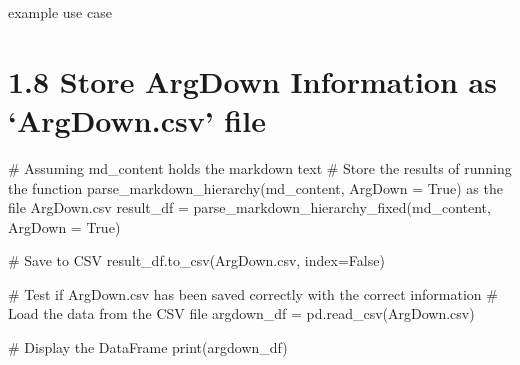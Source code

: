 \documentclass[
  11pt,
  letterpaper,
]{book}
\newenvironment{Shaded}{\begin{snugshade}}{\end{snugshade}}
\newcommand{\BuiltInTok}[1]{\textcolor[rgb]{0.00,0.23,0.31}{#1}}
\newcommand{\CommentTok}[1]{\textcolor[rgb]{0.37,0.37,0.37}{#1}}
\newcommand{\NormalTok}[1]{\textcolor[rgb]{0.00,0.23,0.31}{#1}}
\newcommand{\OperatorTok}[1]{\textcolor[rgb]{0.37,0.37,0.37}{#1}}
\newcommand{\StringTok}[1]{\textcolor[rgb]{0.13,0.47,0.30}{#1}}
\newcommand{\VariableTok}[1]{\textcolor[rgb]{0.07,0.07,0.07}{#1}}
\begin{document}
example use case

\section{1.8 Store ArgDown Information as `ArgDown.csv'
file}\label{store-argdown-information-as-argdown.csv-file}

\begin{Shaded}
\begin{Highlighting}[]
\CommentTok{\# Assuming \textquotesingle{}md\_content\textquotesingle{} holds the markdown text}
\CommentTok{\# Store the results of running the function parse\_markdown\_hierarchy(md\_content, ArgDown = True) as the file \textquotesingle{}ArgDown.csv\textquotesingle{}}
\NormalTok{result\_df }\OperatorTok{=}\NormalTok{ parse\_markdown\_hierarchy\_fixed(md\_content, ArgDown }\OperatorTok{=} \VariableTok{True}\NormalTok{)}

\CommentTok{\# Save to CSV}
\NormalTok{result\_df.to\_csv(}\StringTok{\textquotesingle{}ArgDown.csv\textquotesingle{}}\NormalTok{, index}\OperatorTok{=}\VariableTok{False}\NormalTok{)}
\end{Highlighting}
\end{Shaded}

\begin{Shaded}
\begin{Highlighting}[]
\CommentTok{\# Test if \textquotesingle{}ArgDown.csv\textquotesingle{} has been saved correctly with the correct information}
\CommentTok{\# Load the data from the CSV file}
\NormalTok{argdown\_df }\OperatorTok{=}\NormalTok{ pd.read\_csv(}\StringTok{\textquotesingle{}ArgDown.csv\textquotesingle{}}\NormalTok{)}

\CommentTok{\# Display the DataFrame}
\BuiltInTok{print}\NormalTok{(argdown\_df)}
\end{Highlighting}
\end{Shaded}
\end{document}
